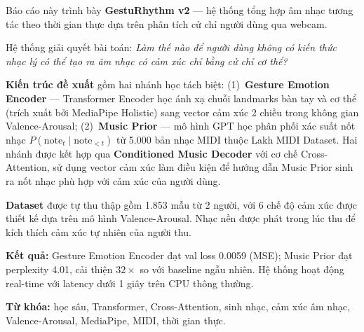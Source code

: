 Báo cáo này trình bày \textbf{GestuRhythm v2} --- hệ thống tổng hợp âm nhạc tương tác
theo thời gian thực dựa trên phân tích cử chỉ người dùng qua webcam.

Hệ thống giải quyết bài toán: \textit{Làm thế nào để người dùng không có kiến thức nhạc lý
có thể tạo ra âm nhạc có cảm xúc chỉ bằng cử chỉ cơ thể?}

\textbf{Kiến trúc đề xuất} gồm hai nhánh học tách biệt:
(1)~\textbf{Gesture Emotion Encoder} --- Transformer Encoder học ánh xạ chuỗi landmarks
bàn tay và cơ thể (trích xuất bởi MediaPipe Holistic) sang vector cảm xúc 2 chiều
trong không gian Valence-Arousal;
(2)~\textbf{Music Prior} --- mô hình GPT học phân phối xác suất nốt nhạc
$P(\text{note}_t \mid \text{note}_{<t})$ từ 5.000 bản nhạc MIDI thuộc Lakh MIDI Dataset.
Hai nhánh được kết hợp qua \textbf{Conditioned Music Decoder} với cơ chế Cross-Attention,
sử dụng vector cảm xúc làm điều kiện để hướng dẫn Music Prior sinh ra nốt nhạc
phù hợp với cảm xúc của người dùng.

\textbf{Dataset} được tự thu thập gồm 1.853 mẫu từ 2 người, với 6 chế độ cảm xúc
được thiết kế dựa trên mô hình Valence-Arousal. Nhạc nền được phát trong lúc thu
để kích thích cảm xúc tự nhiên của người thu.

\textbf{Kết quả:} Gesture Emotion Encoder đạt val loss 0.0059 (MSE);
Music Prior đạt perplexity 4.01, cải thiện $32\times$ so với baseline ngẫu nhiên.
Hệ thống hoạt động real-time với latency dưới 1 giây trên CPU thông thường.

\medskip
\textbf{Từ khóa:} học sâu, Transformer, Cross-Attention, sinh nhạc, cảm xúc âm nhạc,
Valence-Arousal, MediaPipe, MIDI, thời gian thực.
